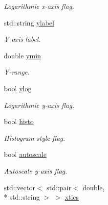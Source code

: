 \begin{DoxyCompactItemize}
\begin{DoxyCompactList}\small\item\em Logarithmic x-\/axis flag. \end{DoxyCompactList}\item 
\hypertarget{a00426_ac969a5a107fbcf66229c2fe680413ea9}{std\-::string \hyperlink{a00426_ac969a5a107fbcf66229c2fe680413ea9}{ylabel}}\label{a00426_ac969a5a107fbcf66229c2fe680413ea9}

\begin{DoxyCompactList}\small\item\em Y-\/axis label. \end{DoxyCompactList}\item 
\hypertarget{a00426_af47eea7344b159425f23e6ca2a7db886}{double \hyperlink{a00426_af47eea7344b159425f23e6ca2a7db886}{ymin}}\label{a00426_af47eea7344b159425f23e6ca2a7db886}

\begin{DoxyCompactList}\small\item\em Y-\/range. \end{DoxyCompactList}\item 
\hypertarget{a00426_ad83b5bd831aa2962d307302ee424a312}{bool \hyperlink{a00426_ad83b5bd831aa2962d307302ee424a312}{ylog}}\label{a00426_ad83b5bd831aa2962d307302ee424a312}

\begin{DoxyCompactList}\small\item\em Logarithmic y-\/axis flag. \end{DoxyCompactList}\item 
\hypertarget{a00426_a4a18be76aaaced5fb4238b11ab8ec56e}{bool \hyperlink{a00426_a4a18be76aaaced5fb4238b11ab8ec56e}{histo}}\label{a00426_a4a18be76aaaced5fb4238b11ab8ec56e}

\begin{DoxyCompactList}\small\item\em Histogram style flag. \end{DoxyCompactList}\item 
\hypertarget{a00426_a2fbf9fa24eecf431588be7324bf637ce}{bool \hyperlink{a00426_a2fbf9fa24eecf431588be7324bf637ce}{autoscale}}\label{a00426_a2fbf9fa24eecf431588be7324bf637ce}

\begin{DoxyCompactList}\small\item\em Autoscale y-\/axis flag. \end{DoxyCompactList}\item 
\hypertarget{a00426_a40068374c389009967b58dfcfaa805b7}{std\-::vector$<$ std\-::pair$<$ double, \\*
std\-::string $>$ $>$ \hyperlink{a00426_a40068374c389009967b58dfcfaa805b7}{xtics}}\label{a00426_a40068374c389009967b58dfcfaa805b7}


\end{DoxyCompactItemize}
